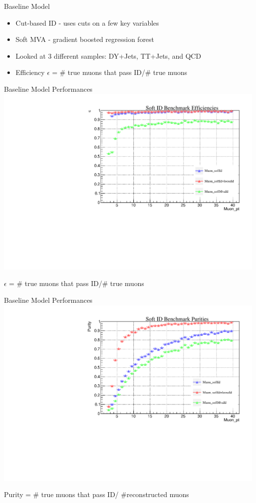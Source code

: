 \documentclass[10pt,handout]{beamer}
\begin{document}
\begin{frame}{Baseline Model}
\begin{itemize}
\item Cut-based ID - uses cuts on a few key variables
\item Soft MVA - gradient boosted regression forest
\item Looked at 3 different samples: DY+Jets, TT+Jets, and QCD
\item Efficiency $\epsilon$ = \# true muons that pass ID/\# true muons
\end{itemize}
\end{frame}




\begin{frame}{Baseline Model Performances}
\includegraphics[scale=.5]{benchmarkEfficiency_TTjets.pdf}

$\epsilon$ = \# true muons that pass ID/\# true muons
\end{frame}


\begin{frame}{Baseline Model Performances}
\includegraphics[scale=.5]{benchmarkPurity_TTjets.pdf}

Purity = \# true muons that pass ID/ \#reconstructed muons
\end{frame}
\end{document}
